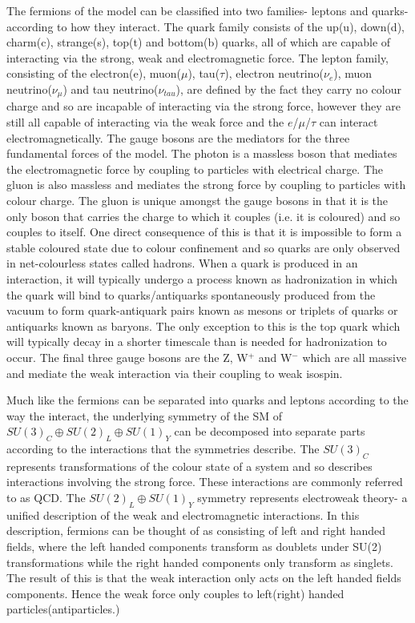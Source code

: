The fermions of the model can be classified into two families- leptons and quarks- according to how they interact. The quark family consists of the up(u), down(d), charm(c), strange(s), top(t) and bottom(b) quarks, all of which are capable of interacting via the strong, weak and electromagnetic force. The lepton family, consisting of the electron(e), muon($\mu$), tau($\tau$), electron neutrino($\nu_{e}$), muon neutrino($\nu_{\mu}$) and tau neutrino($\nu_{tau}$), are defined by the fact they carry no colour charge and so are incapable of interacting via the strong force, however they are still all capable of interacting via the weak force and the $e$/$\mu$/$\tau$ can interact electromagnetically. The gauge bosons are the mediators for the three fundamental forces of the model. The photon is a massless boson that mediates the electromagnetic force by coupling to particles with electrical charge. The gluon is also massless and mediates the strong force by coupling to particles with colour charge. The gluon is unique amongst the gauge bosons in that it is the only boson that carries the charge to which it couples (i.e. it is coloured) and so couples to itself. One direct consequence of this is that it is impossible to form a stable coloured state due to colour confinement and so quarks are only observed in net-colourless states called hadrons. When a quark is produced in an interaction, it will typically undergo a process known as hadronization in which the quark will bind to quarks/antiquarks spontaneously produced from the vacuum to form quark-antiquark pairs known as mesons or triplets of quarks or antiquarks known as baryons. The only exception to this is the top quark which will typically decay in a shorter timescale than is needed for hadronization to occur. The final three gauge bosons are the Z, W$^+$ and W$^-$ which are all massive and mediate the weak interaction via their coupling to weak isospin.

Much like the fermions can be separated into quarks and leptons according to the way the interact, the underlying symmetry of the \ac{SM} of $SU(3)_{C}\oplus SU(2)_{L}\oplus SU(1)_{Y}$ can be decomposed into separate parts according to the interactions that the symmetries describe. The $SU(3)_{C}$ represents transformations of the colour state of a system and so describes interactions involving the strong force. These interactions are commonly referred to as \ac{QCD}. The $SU(2)_{L}\oplus SU(1)_{Y}$ symmetry represents electroweak theory- a unified description of the weak and electromagnetic interactions. In this description, fermions can be thought of as consisting of left and right handed fields, where the left handed components transform as doublets under SU(2) transformations while the right handed components only transform as singlets. The result of this is that the weak interaction only acts on the left handed fields components. Hence the weak force only couples to left(right) handed particles(antiparticles.) 

